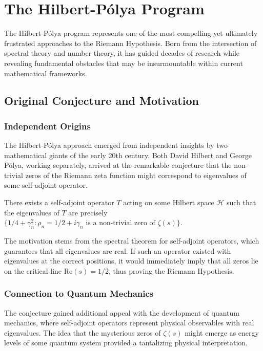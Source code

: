 \chapter{The Hilbert-Pólya Program}
\label{ch:hilbert_polya}

The Hilbert-Pólya program represents one of the most compelling yet ultimately frustrated approaches to the Riemann Hypothesis. Born from the intersection of spectral theory and number theory, it has guided decades of research while revealing fundamental obstacles that may be insurmountable within current mathematical frameworks.

\section{Original Conjecture and Motivation}
\label{sec:original_conjecture}

\subsection{Independent Origins}

The Hilbert-Pólya approach emerged from independent insights by two mathematical giants of the early 20th century. Both David Hilbert and George Pólya, working separately, arrived at the remarkable conjecture that the non-trivial zeros of the Riemann zeta function might correspond to eigenvalues of some self-adjoint operator.

\begin{conjecture}
\label{conj:hilbert_polya}
There exists a self-adjoint operator $T$ acting on some Hilbert space $\mathcal{H}$ such that the eigenvalues of $T$ are precisely $\{1/4 + \gamma_n^2 : \rho_n = 1/2 + i\gamma_n \text{ is a non-trivial zero of } \zeta(s)\}$.
\end{conjecture}

The motivation stems from the spectral theorem for self-adjoint operators, which guarantees that all eigenvalues are real. If such an operator existed with eigenvalues at the correct positions, it would immediately imply that all zeros lie on the critical line $\text{Re}(s) = 1/2$, thus proving the Riemann Hypothesis.

\subsection{Connection to Quantum Mechanics}

The conjecture gained additional appeal with the development of quantum mechanics, where self-adjoint operators represent physical observables with real eigenvalues. The idea that the mysterious zeros of $\zeta(s)$ might emerge as energy levels of some quantum system provided a tantalizing physical interpretation.

